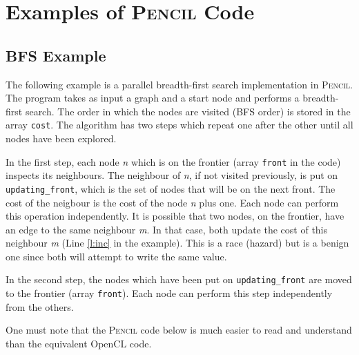 \documentclass{carp}
\newcommand\pencil{\textsc{Pencil}\xspace}
\begin{document}
\section{Examples of \pencil Code}

\subsection{BFS Example}

The following example is a parallel breadth-first search implementation
in \pencil.  The program takes as input a graph and a start node and
performs a breadth-first search.  The order in which the nodes are
visited (BFS order) is stored in the array \lstinline!cost!.  The algorithm has
two steps which repeat one after the other until all nodes have been explored.

In the first step, each node \emph{n} which is on the frontier (array \lstinline!front!
in the code) inspects its neighbours.  The neighbour of \emph{n}, if not visited previously,
is put on \lstinline!updating_front!, which is the set of nodes that will be on
the next front.  The cost of the neigbour is the cost of the node \emph{n} plus one.
Each node can perform this operation independently.  It is possible
that two nodes, on the frontier, have an edge to the same neighbour \emph{m}.  In that
case, both update the cost of this neighbour \emph{m} (Line \ref{l:inc} in the example).
This is a race (hazard) but is a benign one since both will attempt to
write the same value.

In the second step, the nodes which have been put on \lstinline!updating_front!
are moved to the frontier (array \lstinline!front!).  Each node can perform
this step independently from the others.

One must note that the \pencil code below is much easier to read and understand
than the equivalent OpenCL code.
\end{document}
